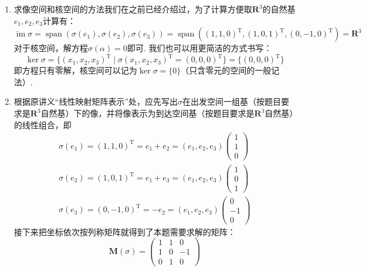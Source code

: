 \documentclass[12pt,fontset=fandol]{ctexart}
\begin{document}
\begin{solve}
\begin{enumerate}
        \item 求像空间和核空间的方法我们在之前已经介绍过，为了计算方便取$\mathbf{R}^3$的自然基$e_1,e_2,e_3$计算有：
              \[
                \operatorname{im}\sigma
                =\operatorname{span}(\sigma(e_1),\sigma(e_2),\sigma(e_3))
                =\operatorname{span}(
                        (1,1,0)^{\mathrm{T}},
                        (1,0,1)^{\mathrm{T}},
                        (0,-1,0)^{\mathrm{T}}
                    )
                =\mathbf{R}^3
              \]
              对于核空间，解方程$\sigma(\alpha)=0$即可. 我们也可以用更简洁的方式书写：
              \[
                \ker\sigma
                =\{
                    (x_1,x_2,x_3)^{\mathrm{T}} \mid
                    \sigma(x_1,x_2,x_3)^{\mathrm{T}}
                    =(0,0,0)^{\mathrm{T}}
                \}
                =\{(0,0,0)^{\mathrm{T}}\}
              \]
              即方程只有零解，核空间可以记为$\ker\sigma=\{0\}$（只含零元的空间的一般记法）.

        \item 根据原讲义“线性映射矩阵表示”处，应先写出$\sigma$在出发空间一组基（按题目要求是$\mathbf{R}^3$自然基）下的像，并将像表示为到达空间基（按题目要求是$\mathbf{R}^3$自然基）的线性组合，即
            \begin{gather*}
                \sigma(e_1) = (1,1,0)^{\mathrm{T}}
                =e_1+e_2=(e_1,e_2,e_3)\begin{pmatrix}
                    1 \\ 1 \\ 0
                \end{pmatrix} \\
                \sigma(e_2) = (1,0,1)^{\mathrm{T}}
                =e_1+e_3=(e_1,e_2,e_3)\begin{pmatrix}
                    1 \\ 0 \\ 1
                \end{pmatrix} \\
                \sigma(e_3) = (0,-1,0)^{\mathrm{T}}
                =-e_2=(e_1,e_2,e_3)\begin{pmatrix}
                    0 \\ -1 \\ 0
                \end{pmatrix}
            \end{gather*}
            接下来把坐标依次按列称矩阵就得到了本题需要求解的矩阵：
            \[
                \mathbf{M}(\sigma)=\begin{pmatrix}
                    1 & 1 & 0  \\
                    1 & 0 & -1 \\
                    0 & 1 & 0
                \end{pmatrix}
            \]
    \end{enumerate}
\end{solve}
\end{document}
